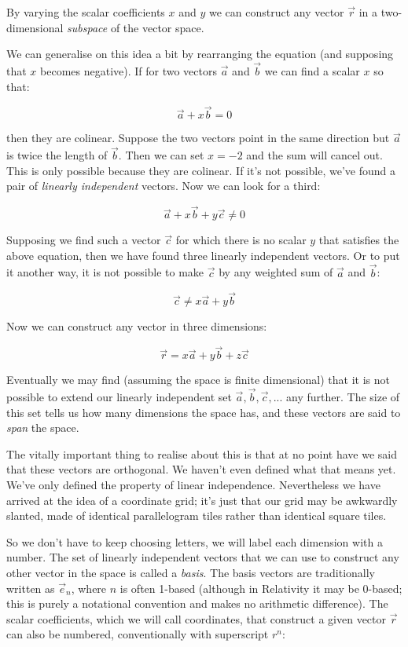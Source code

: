 By varying the scalar coefficients $x$ and $y$ we can construct any vector $\vec{r}$ in a two-dimensional \textit{subspace} of the vector space.

We can generalise on this idea a bit by rearranging the equation (and supposing that $x$ becomes negative). If for two vectors $\vec{a}$ and $\vec{b}$ we can find a scalar ${x}$ so that:

$$ 
\vec{a} + x \vec{b} = 0
$$

then they are colinear. Suppose the two vectors point in the same direction but $\vec{a}$ is twice the length of $\vec{b}$. Then we can set $x = -2$ and the sum will cancel out. This is only possible because they are colinear. If it's not possible, we've found a pair of \textit{linearly independent} vectors. Now we can look for a third:

$$ 
\vec{a} + x \vec{b} + y \vec{c} \ne 0
$$

Supposing we find such a vector $\vec{c}$ for which there is no scalar $y$ that satisfies the above equation, then we have found three linearly independent vectors. Or to put it another way, it is not possible to make $\vec{c}$ by any weighted sum of $\vec{a}$ and $\vec{b}$:

$$
\vec{c} \ne x \vec{a} + y \vec{b}
$$

Now we can construct any vector in three dimensions:

$$
\vec{r} = x \vec{a} + y \vec{b} + z \vec{c}
$$

Eventually we may find (assuming the space is finite dimensional) that it is not possible to extend our linearly independent set $\vec{a}, \vec{b}, \vec{c}, ...$ any further. The size of this set tells us how many dimensions the space has, and these vectors are said to \textit{span} the space.

The vitally important thing to realise about this is that at no point have we said that these vectors are orthogonal. We haven't even defined what that means yet. We've only defined the property of linear independence. Nevertheless we have arrived at the idea of a coordinate grid; it's just that our grid may be awkwardly slanted, made of identical parallelogram tiles rather than identical square tiles.

So we don't have to keep choosing letters, we will label each dimension with a number. The set of linearly independent vectors that we can use to construct any other vector in the space is called a \textit{basis}. The basis vectors are traditionally written as $\vec{e}_n$, where $n$ is often 1-based (although in Relativity it may be 0-based; this is purely a notational convention and makes no arithmetic difference). The scalar coefficients, which we will call coordinates, that construct a given vector $\vec{r}$ can also be numbered, conventionally with superscript $r^n$:

